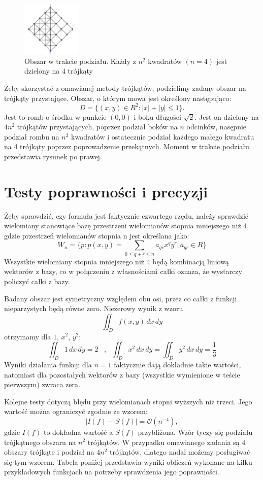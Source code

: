 \documentclass[a4paper,12pt]{article}
\begin{document}
\begin{figure} %
    \centering
    \includegraphics[width=0.25\textwidth]{rys1.png}
     \footnotesize \caption{ Obszar w trakcie podziału. Każdy z $n^2$ kwadratów $(n=4)$ jest dzielony na 4 trójkąty}
\end{figure}
Żeby skorzystać z omawianej metody trójkątów, podzielimy zadany obszar na trójkąty przystające. Obszar, o którym mowa jest określony następująco:
\[ D = \{ ( x,y) \in R^2: |x| + |y| \leq 1 \}. \]
Jest to romb o środku w punkcie $(0,0)$ i boku długości $\sqrt{2}$. Jest on dzielony na $4n^2$ trójkątów przystających, poprzez podział boków na $n$ odcinków, nasępnie podział rombu na $n^2$ kwadratów i ostatecznie podział każdego małego kwadratu na 4 trójkąty poprzez poprowadzenie przekątnych. Moment w trakcie podziału przedstawia rysunek po prawej.



\section*{Testy poprawności i precyzji}
Żeby sprawdzić, czy formuła jest faktycznie czwartego rzędu, należy sprawdzić wielomiany stanowiące bazę przestrzeni wielomianów stopnia mniejszego niż 4, gdzie przestrzeń wielomianów stopnia n jest określana jako:
\[ W_n = \{ p: p(x,y) = \sum_{0 \leq q+r \leq n} a_{qr}x^qy^r, a_{qr} \in R \} \]
Wszystkie wielomiany stopnia mniejszego niż 4 będą kombinacją liniową wektorów z bazy, co w połączeniu z własnościami całki oznaza, że wystarczy policzyć całki z bazy.

Badany obszar jest symetryczny względem obu osi, przez co całki z funkcji nieparzystych będą równe zero. Niezerowy wynik z wzoru 
\[ \iint_D f(x,y) \,dx\,dy \]
otrzymamy dla $1$, $x^2$, $y^2$:
\[ \iint_D 1 \,dx\,dy = 2 \;\;\; , \;\;   \iint_D x^2 \,dx\,dy =  \iint_D y^2 \,dx\,dy = \frac{1}{3} \]
Wyniki działania funkcji dla $n=1$ faktycznie dają dokładnie takie wartości, natomiast dla pozostałych wektorów z bazy (wszystkie wymienione w teście pierwszym) zwraca zera. 

Kolejne testy dotyczą błędu przy wielomianach stopni wyższych niż trzeci. Jego wartość można ograniczyć zgodnie ze wzorem:
\[ |I(f) - S(f) | = \mathcal{O}(n^{-4}), \]
gdzie $I(f)$ to dokładna wartość a $S(f)$ przybliżona. Wzór tyczy się podziału trójkątnego obszaru na $n^2$ trójkątów. W przypadku omawianego zadania są 4 obszary trójkąte i podział na $4n^2$ trójkątów, dlatego nadal możemy posługiwać się tym wzorem. Tabela poniżej przedstawia wyniki obliczeń wykonane na kilku przykładowych funkcjach na potrzeby sprawdzenia jego poprawności.
\end{document}
